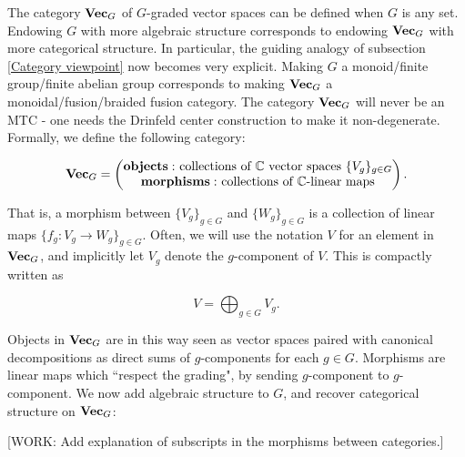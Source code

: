 \documentclass{article}
\theoremstyle{definition}
\numberwithin{figure}{section}
\begin{document}
The category $\bold{Vec}_G$ of $G$-graded vector spaces can be defined when $G$ is any set. Endowing $G$ with more algebraic structure corresponds to endowing $\bold{Vec}_G$ with more categorical structure. In particular, the guiding analogy of subsection \ref{Category viewpoint} now becomes very explicit. Making $G$ a monoid/finite group/finite abelian group corresponds to making $\bold{Vec}_G$ a monoidal/fusion/braided fusion category. The category $\bold{Vec}_G$ will never be an MTC - one needs the Drinfeld center construction to make it non-degenerate. Formally, we define the following category:

$$\bold{Vec}_G=
\begin{pmatrix}
\bold{objects: }\text{ collections of $\mathbb{C}$ vector spaces }\{V_g\}_{g\in G}\\
\bold{morphisms: }\text{ collections of $\mathbb{C}$-linear maps}
\end{pmatrix}.$$

That is, a morphism between $\{V_g\}_{g\in G}$ and $\{W_g\}_{g\in G}$ is a collection of linear maps $\{f_g:V_g\to W_g\}_{g\in G}.$ Often, we will use the notation $V$ for an element in $\bold{Vec}_G$, and implicitly let $V_g$ denote the $g$-component of $V$. This is compactly written as

$$V=\bigoplus_{g\in G}V_g.$$

Objects in $\bold{Vec}_G$ are in this way seen as vector spaces paired with canonical decompositions as direct sums of $g$-components for each $g\in G$. Morphisms are linear maps which ``respect the grading", by sending $g$-component to $g$-component. We now add algebraic structure to $G$, and recover categorical structure on $\bold{Vec}_G$:

[WORK: Add explanation of subscripts in the morphisms between categories.]
\end{document}
